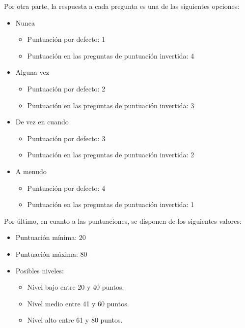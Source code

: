         Por otra parte, la respuesta a cada pregunta es una de las siguientes opciones:
        \begin{itemize}
            \item Nunca
                \begin{itemize}
                    \item Puntuación por defecto: 1
                    \item Puntuación en las preguntas de puntuación invertida: 4
                \end{itemize}
            \item Alguna vez
                \begin{itemize}
                    \item Puntuación por defecto: 2
                    \item Puntuación en las preguntas de puntuación invertida: 3
                \end{itemize}
            \item De vez en cuando
                \begin{itemize}
                    \item Puntuación por defecto: 3
                    \item Puntuación en las preguntas de puntuación invertida: 2
                \end{itemize}
            \item A menudo
                \begin{itemize}
                    \item Puntuación por defecto: 4
                    \item Puntuación en las preguntas de puntuación invertida: 1
                \end{itemize}
        \end{itemize}

        Por último, en cuanto a las puntuaciones, se disponen de los siguientes valores:
        \begin{itemize}
            \item Puntuación mínima: 20
            \item Puntuación máxima: 80
            \item Posibles niveles:
                \begin{itemize}
                    \item Nivel bajo entre 20 y 40 puntos.
                    \item Nivel medio entre 41 y 60 puntos.
                    \item Nivel alto entre 61 y 80 puntos.
                \end{itemize}
        \end{itemize} 
